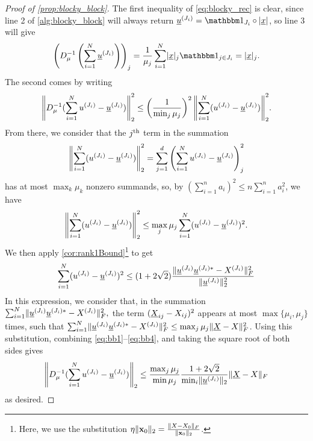 \begin{proof}[Proof of \cref{prop:blocky_block}]
  The first inequality of \eqref{eq:blocky_rec} is clear, since line 2 of \cref{alg:blocky_block} will always return $\uu^{(J_i)} = \one_{J_i} \circ \abs{\ux}$, so line 3 will give \[ \left(D_\mu^{-1}\left(\sum_{i = 1}^N \uu^{(J_i)}\right)\right)_j = \frac{1}{\mu_j} \sum_{i = 1}^N \abs{\ux}_j \one_{j \in J_i} = \abs{\ux}_j.\]  %
  The second comes by writing \begin{equation} \norm*{D_\mu^{-1}(\sum_{i = 1}^N u^{(J_i)} - \uu^{(J_i)})}_2^2 \le \left(\frac{1}{\min_j \mu_j}\right)^2 \norm*{\sum_{i = 1}^N (u^{(J_i)} - \uu^{(J_i)})}_2^2. \label{eq:bb1} \end{equation}  From there, we consider that the $j\th$ term in the summation \begin{equation}\norm*{\sum_{i = 1}^N (u^{(J_i)} - \uu^{(J_i)})}_2^2 = \sum_{j = 1}^d \left(\sum_{i = 1}^N u^{(J_i)} - \uu^{(J_i)}\right)_j^2\label{eq:bb2}\end{equation} has at most $\max_k \mu_k$ nonzero summands, so, by $(\sum_{i=1}^n a_i)^2 \le n \sum_{i=1}^n a_i^2$, we have \begin{equation}\norm*{\sum_{i = 1}^N (u^{(J_i)} - \uu^{(J_i)})}_2^2 \le \max_j \mu_j \sum_{i = 1}^N (u^{(J_i)} - \uu^{(J_i)})^2.\label{eq:bb3}\end{equation}  We then apply \cref{cor:rank1Bound}\footnote{Here, we use the substitution $\eta \norm{\x_0}_2 = \frac{\norm{X - X_0}_F}{\norm{\x_0}_2}$.} to get \begin{equation} \sum_{i = 1}^N (u^{(J_i)} - \uu^{(J_i)})^2 \le (1 + 2 \sqrt{2}) \dfrac{\norm{\uu^{(J_i)} \uu^{(J_i)*} - X^{(J_i)}}_F^2}{\norm{\uu^{(J_i)}}_2^2} \label{eq:bb4} \end{equation}  In this expression, we consider that, in the summation $\sum_{i = 1}^N \norm{\uu^{(J_i)} \uu^{(J_i)*} - X^{(J_i)}}_F^2,$ the term $(\uX_{ij} - X_{ij})^2$ appears at most $\max\{\mu_i, \mu_j\}$ times, such that $\sum_{i = 1}^N \norm{\uu^{(J_i)} \uu^{(J_i)*} - X^{(J_i)}}_F^2 \le \max_j \mu_j \norm{\uX - X}_F^2$.  Using this substitution, combining \eqref{eq:bb1}--\eqref{eq:bb4}, and taking the square root of both sides gives \[\norm*{D_\mu^{-1}(\sum_{i = 1}^N u^{(J_i)} - \uu^{(J_i)})}_2 \le \dfrac{\max_j \mu_j}{\min \mu_j} \dfrac{1 + 2 \sqrt{2}}{\min_i \norm{\uu^{(J_i)}}_2} \norm{\uX - X}_F\] as desired.


\end{proof}
